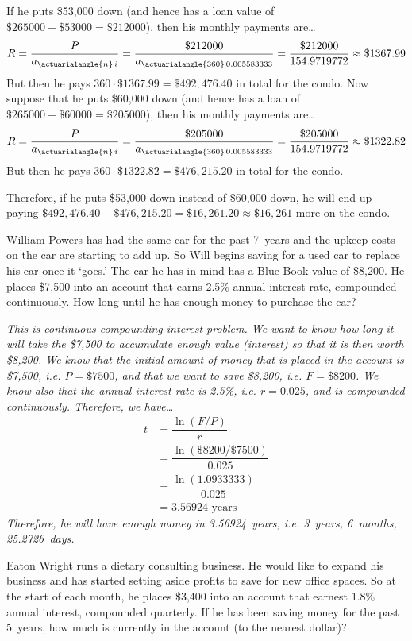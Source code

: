 \documentclass[12pt,letterpaper]{exam}
\begin{document}
\begin{questions}
{If he puts \$53,000 down (and hence has a loan value of $\$265000 - \$53000= \$212000$), then his monthly payments are\dots
	\[
	R= \dfrac{P}{a_{\actuarialangle{n}\,i}}= \dfrac{\$212000}{a_{\actuarialangle{360}\,0.005583333}}= \dfrac{\$212000}{154.9719772} \approx \$1367.99
	\]
But then he pays $360 \cdot \$1367.99= \$492,476.40$ in total for the condo. Now suppose that he puts \$60,000 down (and hence has a loan of $\$265000 - \$60000= \$205000$), then his monthly payments are\dots
	\[
	R= \dfrac{P}{a_{\actuarialangle{n}\,i}}= \dfrac{\$205000}{a_{\actuarialangle{360}\,0.005583333}}= \dfrac{\$205000}{154.9719772} \approx \$1322.82
	\]
But then he pays $360 \cdot \$1322.82= \$476,215.20$ in total for the condo. \pspace

Therefore, if he puts \$53,000 down instead of \$60,000 down, he will end up paying $\$492,476.40 - \$476,215.20= \$16,261.20 \approx \$16,261$ more on the condo. 
}



\newpage
\question[10] William Powers has had the same car for the past 7~years and the upkeep costs on the car are starting to add up. So Will begins saving for a used car to replace his car once it `goes.' The car he has in mind has a Blue Book value of \$8,200. He places \$7,500 into an account that earns 2.5\% annual interest rate, compounded continuously. How long until he has enough money to purchase the car? \pspace

{\itshape
\sol This is continuous compounding interest problem. We want to know how long it will take the \$7,500 to accumulate enough value (interest) so that it is then worth \$8,200. We know that the initial amount of money that is placed in the account is \$7,500, i.e. $P= \$7500$, and that we want to save \$8,200, i.e. $F= \$8200$. We know also that the annual interest rate is 2.5\%, i.e. $r= 0.025$, and is compounded continuously. Therefore, we have\dots
	\[
	\begin{aligned}
	t&= \dfrac{\ln(F/P)}{r} \\[0.3cm]
	&= \dfrac{\ln(\$8200/\$7500)}{0.025} \\[0.3cm]
	&= \dfrac{\ln(1.0933333)}{0.025} \\[0.3cm]
	&= 3.56924 \text{ years}
	\end{aligned}
	\]
Therefore, he will have enough money in 3.56924~years, i.e. 3~years, 6~months, 25.2726~days. 
}



\newpage
\question[10] Eaton Wright runs a dietary consulting business. He would like to expand his business and has started setting aside profits to save for new office spaces. So at the start of each month, he places \$3,400 into an account that earnest 1.8\% annual interest, compounded quarterly. If he has been saving money for the past 5~years, how much is currently in the account (to the nearest dollar)? \pspace


\end{questions}
\end{document}
